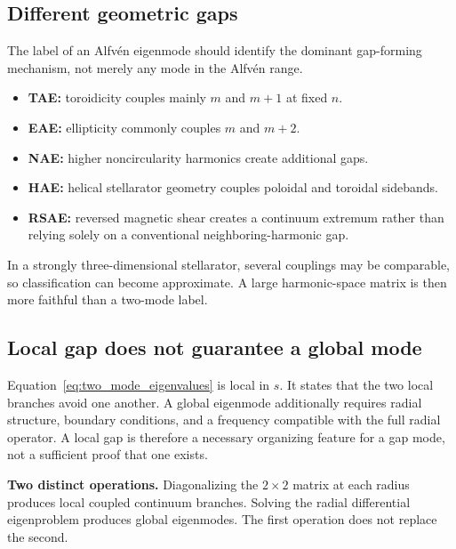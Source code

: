 \subsection{Different geometric gaps}
The label of an Alfv\'en eigenmode should identify the dominant gap-forming mechanism, not merely any mode in the Alfv\'en range.
\begin{itemize}[leftmargin=1.6em]
\item \textbf{TAE:} toroidicity couples mainly $m$ and $m+1$ at fixed $n$.
\item \textbf{EAE:} ellipticity commonly couples $m$ and $m+2$.
\item \textbf{NAE:} higher noncircularity harmonics create additional gaps.
\item \textbf{HAE:} helical stellarator geometry couples poloidal and toroidal sidebands.
\item \textbf{RSAE:} reversed magnetic shear creates a continuum extremum rather than relying solely on a conventional neighboring-harmonic gap.
\end{itemize}
In a strongly three-dimensional stellarator, several couplings may be comparable, so classification can become approximate. A large harmonic-space matrix is then more faithful than a two-mode label.

\subsection{Local gap does not guarantee a global mode}
Equation~\eqref{eq:two_mode_eigenvalues} is local in $s$. It states that the two local branches avoid one another. A global eigenmode additionally requires radial structure, boundary conditions, and a frequency compatible with the full radial operator. A local gap is therefore a necessary organizing feature for a gap mode, not a sufficient proof that one exists.

\begin{physicsbox}
\textbf{Two distinct operations.} Diagonalizing the $2\times2$ matrix at each radius produces local coupled continuum branches. Solving the radial differential eigenproblem produces global eigenmodes. The first operation does not replace the second.
\end{physicsbox}
